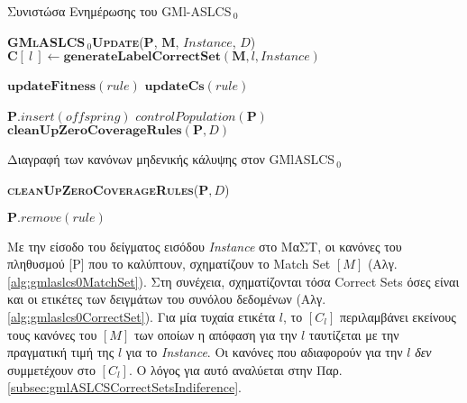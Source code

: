\begin{algorithm} 
 \caption{Συνιστώσα Ενημέρωσης του GMl-ASLCS$_{\:0}$}
\label{alg:gmlaslcs0Update}
 \begin{algorithmic}[1]
  \STATE \textbf{\textsc{GMlASLCS$_{\:0}$Update}}($\textbf{P}$, $\textbf{M}$, $Instance$, $D$)
			\STATE $\textbf{C}[\:l\:] \gets \textbf{generateLabelCorrectSet}(\textbf{M}, l, Instance)$
		\ENDFOR
		
			\STATE $\textbf{updateFitness}(rule)$
				\STATE $\textbf{updateCs}(rule)$
			\ENDIF
		\ENDFOR	
		
				\ENDIF
			\ELSE
			\ENDIF
			\STATE $\textbf{P}.insert(offspring)$
				\STATE $controlPopulation(\textbf{P})$
			\ENDIF
		\ENDFOR
			\STATE $\textbf{cleanUpZeroCoverageRules}(\textbf{P}, D)$
		\ENDIF
 \end{algorithmic}
\end{algorithm}






\begin{algorithm} 
 \caption{Διαγραφή των κανόνων μηδενικής κάλυψης στον GMlASLCS$_{\:0}$}
\label{alg:gmlaslcs0ZeroCov}
 \begin{algorithmic}[1]
   \STATE \textbf{\textsc{cleanUpZeroCoverageRules}}($\textbf{P}, D$)
  	
			\STATE $\textbf{P}.remove(rule)$
		\ENDIF
  	\ENDFOR
 
 \end{algorithmic}
\end{algorithm}

Με την είσοδο του δείγματος εισόδου \emph{Instance} στο ΜαΣΤ, οι κανόνες του πληθυσμού [P] που το καλύπτουν, σχηματίζουν το Match Set $[M]$ (Αλγ. \ref{alg:gmlaslcs0MatchSet}). Στη συνέχεια, σχηματίζονται τόσα Correct Sets όσες είναι και οι ετικέτες των δειγμάτων του συνόλου δεδομένων (Αλγ. \ref{alg:gmlaslcs0CorrectSet}). Για μία τυχαία ετικέτα $l$, το $[C_{l}]$ περιλαμβάνει εκείνους τους κανόνες του $[M]$ των οποίων η απόφαση για την $l$ ταυτίζεται με την πραγματική τιμή της $l$ για το \emph{Instance}. Οι κανόνες που αδιαφορούν για την $l$ \emph{δεν} συμμετέχουν στο $[C_{l}]$. Ο λόγος για αυτό αναλύεται στην Παρ. \ref{subsec:gmlASLCSCorrectSetsIndiference}. 
\\


